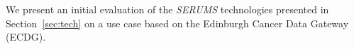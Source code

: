 \noindent
We present an initial evaluation of the \emph{SERUMS} technologies presented in Section~\ref{sec:tech} on a use case based on the Edinburgh Cancer Data Gateway (ECDG).


